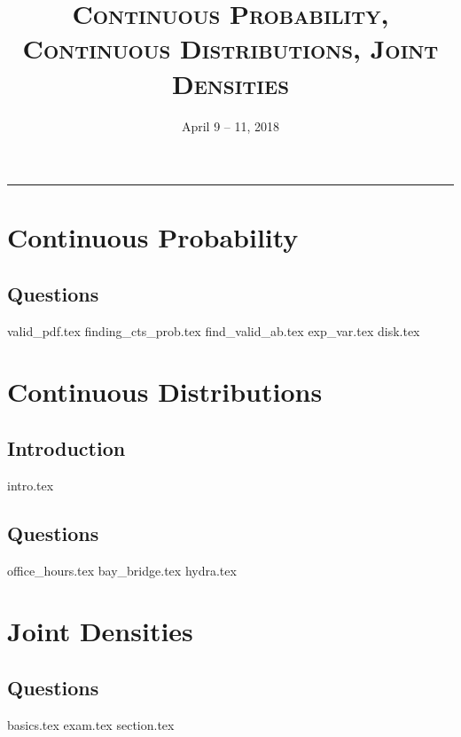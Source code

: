 \documentclass{exam}
\title{\textsc{Continuous Probability, Continuous Distributions, Joint Densities}}
\date{April 9 -- 11, 2018}
\begin{document}
\maketitle
\rule{\textwidth}{0.15em}
\fontsize{12}{15}\selectfont
\thispagestyle{empty}

\section{Continuous Probability}

\subsection{Questions}
\begin{questions}
    {valid_pdf.tex}
    {finding_cts_prob.tex} 
    {find_valid_ab.tex}
    {exp_var.tex}
    {disk.tex}
\end{questions}

\section{Continuous Distributions}
\subsection{Introduction}
{intro.tex}
\subsection{Questions}
\begin{questions}
    {office_hours.tex}
    {bay_bridge.tex}
    {hydra.tex}
\end{questions} 

\section{Joint Densities}
\subsection{Questions}
\begin{questions}
	{basics.tex}
	{exam.tex}
	{section.tex}
\end{questions}
\end{document}

